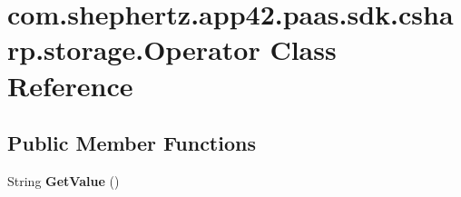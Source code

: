 \hypertarget{classcom_1_1shephertz_1_1app42_1_1paas_1_1sdk_1_1csharp_1_1storage_1_1_operator}{\section{com.\+shephertz.\+app42.\+paas.\+sdk.\+csharp.\+storage.\+Operator Class Reference}
\label{classcom_1_1shephertz_1_1app42_1_1paas_1_1sdk_1_1csharp_1_1storage_1_1_operator}
}
\subsection*{Public Member Functions}
\begin{DoxyCompactItemize}
\item 
\hypertarget{classcom_1_1shephertz_1_1app42_1_1paas_1_1sdk_1_1csharp_1_1storage_1_1_operator_a82c851b0e379833495b4e25a14876b66}{String {\bfseries Get\+Value} ()}\label{classcom_1_1shephertz_1_1app42_1_1paas_1_1sdk_1_1csharp_1_1storage_1_1_operator_a82c851b0e379833495b4e25a14876b66}

\end{DoxyCompactItemize}
